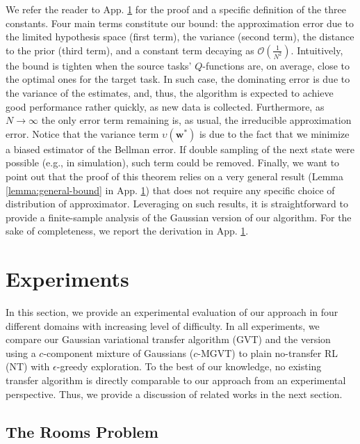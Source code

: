 \documentclass{article}
\begin{document}
We refer the reader to App. \ref{} for the proof and a specific definition of the three constants. Four main terms constitute our bound: the approximation error due to the limited hypothesis space (first term), the variance (second term), the distance to the prior (third term), and a constant term decaying as $\mathcal{O}(\frac{1}{N^2})$. Intuitively, the bound is tighten when the source tasks' $Q$-functions are, on average, close to the optimal ones for the target task. In such case, the dominating error is due to the variance of the estimates, and, thus, the algorithm is expected to achieve good performance rather quickly, as new data is collected. Furthermore, as $N\rightarrow\infty$ the only error term remaining is, as usual, the irreducible approximation error. Notice that the variance term $\upsilon(\bm{w}^*)$ is due to the fact that we minimize a biased estimator of the Bellman error. If double sampling of the next state were possible (e.g., in simulation), such term could be removed. Finally, we want to point out that the proof of this theorem relies on a very general result (Lemma \ref{lemma:general-bound} in App. \ref{}) that does not require any specific choice of distribution of approximator. Leveraging on such results, it is straightforward to provide a finite-sample analysis of the Gaussian version of our algorithm. For the sake of completeness, we report the derivation in App. \ref{}.

\section{Experiments}

In this section, we provide an experimental evaluation of our approach in four different domains with increasing level of difficulty. In all experiments, we compare our Gaussian variational transfer algorithm (GVT) and the version using a $c$-component mixture of Gaussians ($c$-MGVT) to plain no-transfer RL (NT) with $\epsilon$-greedy exploration. To the best of our knowledge, no existing transfer algorithm is directly comparable to our approach from an experimental perspective. Thus, we provide a discussion of related works in the next section. 

\subsection{The Rooms Problem} \label{sec:gw}
\end{document}
